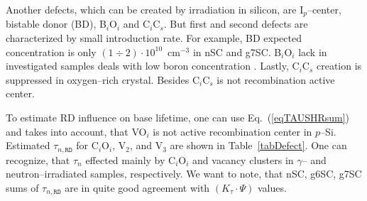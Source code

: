 \documentclass[aip,jap, amsmath,amssymb,reprint]{revtex4-1}
\begin{document}

Another defects, which can be created by irradiation in silicon, are I$_p$--center, bistable donor (BD), B$_i$O$_i$ and C$_i$C$_s$.
But first and second defects are characterized by small introduction rate.
For example, BD expected\cite{n:gamma,BD:Fret} concentration is only $(1\div2)\cdot10^{10}$~cm$^{-3}$ in nSC and g7SC.
B$_i$O$_i$ lack in investigated samples deals with low boron concentration \cite{SiIntDef}.
Lastly,  C$_i$C$_s$ creation is suppressed in oxygen--rich crystal.\cite{gamma:Kolk,gamma:Stahl,n:long}
Besides C$_i$C$_s$ is not recombination active center.\cite{CiCs:Song}

To estimate RD influence on base lifetime, one can use Eq.~(\ref{eqTAUSHRsum})
and takes into account, that
VO$_i$ is not active recombination center in $p$--Si.\cite{gamma:Kolkov,IrrCzpSi:Benton,IrrCzpSi:Coffa,IrrCzpSi:Ganagona,IrrCzpSi:Vines}
Estimated $\tau_{n,\mathtt{RD}}$ for C$_i$O$_i$, V$_2$, and  V$_3$ are shown in Table~\ref{tabDefect}.
One can recognize, that $\tau_n$ effected mainly by C$_i$O$_i$ and vacancy clusters in $\gamma$-- and neutron--irradiated samples, respectively.
We want to note, that nSC, g6SC, g7SC sums of $\tau_{n,\mathtt{RD}}$ are in quite good agreement with $(K_\tau\cdot\Psi)$ values.
\end{document}
